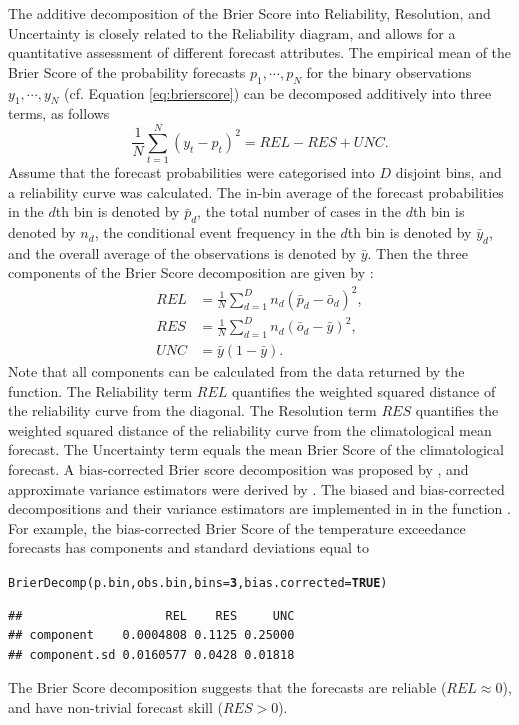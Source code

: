 \documentclass[article]{jss}\usepackage[]{graphicx}\usepackage[]{color}
\makeatletter
\newcommand{\hlnum}[1]{\textcolor[rgb]{0.502,0,0.502}{\textbf{#1}}}%
\newcommand{\hlstd}[1]{\textcolor[rgb]{0,0,0}{#1}}%
\newcommand{\hlkwc}[1]{\textcolor[rgb]{0,0.502,0.753}{#1}}%
\newcommand{\hlkwd}[1]{\textcolor[rgb]{0,0.267,0.4}{#1}}%
\newenvironment{kframe}{%
 \def\at@end@of@kframe{}%
 \ifinner\ifhmode%
  \def\at@end@of@kframe{\end{minipage}}%
  \begin{minipage}{\columnwidth}%
 \fi\fi%
 \def\FrameCommand##1{\hskip\@totalleftmargin \hskip-\fboxsep
 \colorbox{shadecolor}{##1}\hskip-\fboxsep
     \hskip-\linewidth \hskip-\@totalleftmargin \hskip\columnwidth}%
 \MakeFramed {\advance\hsize-\width
   \@totalleftmargin\z@ \linewidth\hsize
   \@setminipage}}%
 {\par\unskip\endMakeFramed%
 \at@end@of@kframe}
\newenvironment{knitrout}{}{} %
\makeatother
\begin{document}
The additive decomposition of the Brier Score into Reliability, Resolution, and Uncertainty is closely related to the Reliability diagram, and allows for a quantitative assessment of different forecast attributes.
The empirical mean of the Brier Score of the probability forecasts $p_1, \cdots, p_N$ for the binary observations $y_1, \cdots, y_N$ (cf. Equation \ref{eq:brierscore}) can be decomposed additively into three terms, as follows
%
\begin{equation}
\frac{1}{N}\sum_{t=1}^N (y_t - p_t)^2 = REL - RES + UNC.
\end{equation}
%
Assume that the forecast probabilities were categorised into $D$ disjoint bins, and a reliability curve was calculated.
The in-bin average of the forecast probabilities in the $d$th bin is denoted by $\bar{p}_d$, the total number of cases in the $d$th bin is denoted by $n_d$, the conditional event frequency in the $d$th bin is denoted by $\bar{y}_d$, and the overall average of the observations is denoted by $\bar{y}$.
Then the three components of the Brier Score decomposition are given by \citet{murphy1973new}:
%
\begin{align}
REL & = \frac{1}{N}\sum_{d=1}^D n_d (\bar{p}_d - \bar{o}_d)^2,\\
RES & = \frac{1}{N}\sum_{d=1}^D n_d (\bar{o}_d - \bar{y})^2,\\
UNC & = \bar{y}(1-\bar{y}).
\end{align}
%
Note that all components can be calculated from the data returned by the  function.
The Reliability term $REL$ quantifies the weighted squared distance of the reliability curve from the diagonal.
The Resolution term $RES$ quantifies the weighted squared distance of the reliability curve from the climatological mean forecast.
The Uncertainty term equals the mean Brier Score of the climatological forecast.
A bias-corrected Brier score decomposition was proposed by \citet{ferro2012bias}, and approximate variance estimators were derived by \citet{siegert2013variance}.
The biased and bias-corrected decompositions and their variance estimators are implemented in  in the function .
For example, the bias-corrected Brier Score of the temperature exceedance forecasts has components and standard deviations equal to
%
\begin{knitrout}
\color{fgcolor}\begin{kframe}
\begin{alltt}
\hlkwd{BrierDecomp}\hlstd{(p.bin, obs.bin,} \hlkwc{bins}\hlstd{=}\hlnum{3}\hlstd{,} \hlkwc{bias.corrected}\hlstd{=}\hlnum{TRUE}\hlstd{)}
\end{alltt}
\begin{verbatim}
##                    REL    RES     UNC
## component    0.0004808 0.1125 0.25000
## component.sd 0.0160577 0.0428 0.01818
\end{verbatim}
\end{kframe}
\end{knitrout}
%
The Brier Score decomposition suggests that the forecasts are reliable ($REL\approx 0$), and have non-trivial forecast skill ($RES > 0$). 
\end{document}
